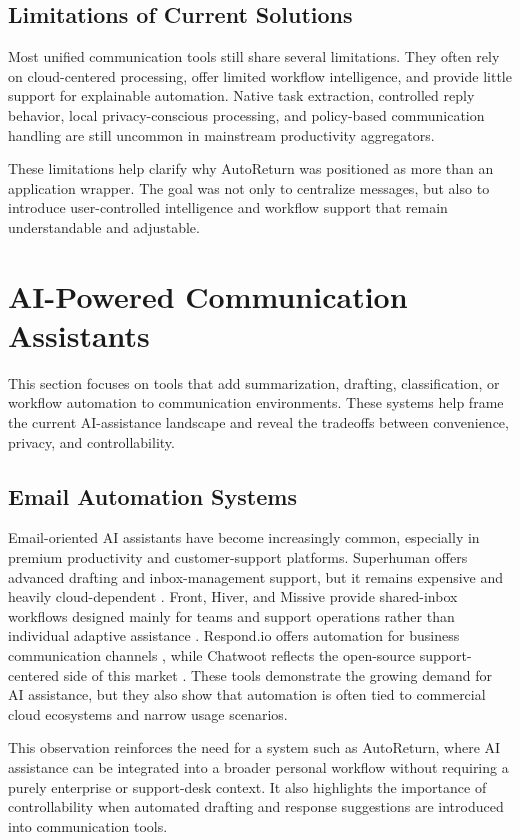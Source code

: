 \subsection{Limitations of Current Solutions}
Most unified communication tools still share several limitations. They often rely on cloud-centered processing, offer limited workflow intelligence, and provide little support for explainable automation. Native task extraction, controlled reply behavior, local privacy-conscious processing, and policy-based communication handling are still uncommon in mainstream productivity aggregators.

These limitations help clarify why AutoReturn was positioned as more than an application wrapper. The goal was not only to centralize messages, but also to introduce user-controlled intelligence and workflow support that remain understandable and adjustable.

\section{AI-Powered Communication Assistants}
\noindent This section focuses on tools that add summarization, drafting, classification, or workflow automation to communication environments. These systems help frame the current AI-assistance landscape and reveal the tradeoffs between convenience, privacy, and controllability.

\subsection{Email Automation Systems}
Email-oriented AI assistants have become increasingly common, especially in premium productivity and customer-support platforms. Superhuman offers advanced drafting and inbox-management support, but it remains expensive and heavily cloud-dependent \cite{superhuman2024}. Front, Hiver, and Missive provide shared-inbox workflows designed mainly for teams and support operations rather than individual adaptive assistance \cite{front2024}. Respond.io offers automation for business communication channels \cite{respond2024}, while Chatwoot reflects the open-source support-centered side of this market \cite{chatwoot2024}. These tools demonstrate the growing demand for AI assistance, but they also show that automation is often tied to commercial cloud ecosystems and narrow usage scenarios.

This observation reinforces the need for a system such as AutoReturn, where AI assistance can be integrated into a broader personal workflow without requiring a purely enterprise or support-desk context. It also highlights the importance of controllability when automated drafting and response suggestions are introduced into communication tools.


